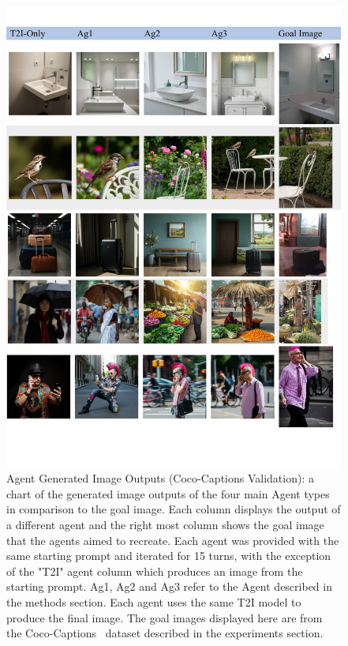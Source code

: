 \begin{figure}
    \centering
    \includegraphics[width=\linewidth]{figures/coco_data_chart_part2.pdf}
    \caption{Agent Generated Image Outputs (Coco-Captions Validation): a chart of the generated image outputs of the four main Agent types in comparison to the goal image. Each column displays the output of a different agent and the right most column shows the goal image that the agents aimed to recreate. Each agent was provided with the same starting prompt and iterated for 15 turns, with the exception of the "T2I" agent column which produces an image from the starting prompt. Ag1, Ag2 and Ag3 refer to the Agent described in the methods section. Each agent uses the same T2I model to produce the final image. The goal images displayed here are from the Coco-Captions~\cite{chen2015microsoft} dataset described in the experiments section.}
    \label{fig:coco2}
\end{figure}
